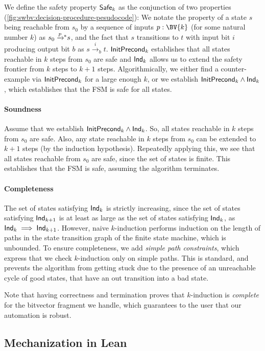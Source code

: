 We define the safety property $\mathsf{Safe}_k$ as the conjunction of two properties (\autoref{fig:swbv:decision-procedure-pesudocode}):
We notate the property of a state $s$ being reachable from $s_0$ by a sequence of inputs $p : \BV{k}$ (for some natural number $k$) as $s_0 \xrightarrow{\footnotesize p}\!\!^* s$,
and the fact that $s$ transitions to $t$ with input bit $i$ producing output bit $b$ as $s \xrightarrow{i}_b t$.
$\mathsf{InitPrecond}_k$ establishes that all states reachable in $k$ steps from $s_0$ are safe
and $\mathsf{Ind}_k$ allows us to extend the safety frontier from $k$ steps to $k+1$ steps.
Algorithmically, we either find a counter-example via $\mathsf{InitPrecond}_k$ for a
large enough $k$, or we establish $\mathsf{InitPrecond}_k \land \mathsf{Ind}_k$, which establishes that the FSM is safe for all states.

\paragraph{Soundness}
Assume that we establish $\mathsf{InitPrecond}_k \land \mathsf{Ind}_k$.
So, all states reachable in $k$ steps from $s_0$ are safe.
Also, any state reachable in $k$ steps from $s_0$ can be extended to $k+1$ steps (by the induction hypothesis).
Repeatedly applying this, we see that all states reachable from $s_0$ are safe, since the set of states is finite.
This establishes that the FSM is safe, assuming the algorithm terminates.

\paragraph{Completeness}
The set of states satisfying $\mathsf{Ind}_k$ is strictly increasing, since the set of states satisfying $\mathsf{Ind}_{k+1}$ is at least as large as the set of states satisfying $\mathsf{Ind}_{k}$,
as $\mathsf{Ind}_{k} \implies \mathsf{Ind}_{k+1}$.
However, naive $k$-induction performs induction on the length of paths in the state transition graph of the finite state machine, which is unbounded.
To ensure completeness, we add \emph{simple path constraints},
which express that we check $k$-induction only on simple paths.
This is standard, and prevents the algorithm from getting stuck due to the presence of an unreachable
cycle of good states, that have an out transition into a bad state.

Note that having correctness and termination proves that $k$-induction is \emph{complete} for the bitvector fragment we handle, which guarantees to the user that our automation is robust.

\subsection{Mechanization in Lean}

